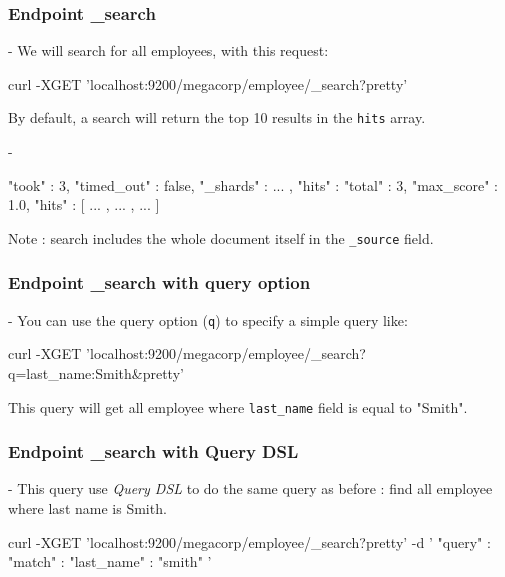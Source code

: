 \documentclass[]{beamer}
\begin{document}
\subsubsection{Endpoint \_search}

\begin{frame}[containsverbatim]{\subsecname{} - \subsubsecname{}}
  We will search for all employees, with this request:
  \begin{command}
curl -XGET 'localhost:9200/megacorp/employee/_search?pretty'
  \end{command}

  By default, a search will return the top 10 results in the \texttt{hits} array.
\end{frame}

\begin{frame}[containsverbatim]{\subsecname{} - \subsubsecname{}}
  \begin{command}
{
  "took" : 3,
  "timed_out" : false,
  "_shards" : { ... },
  "hits" : {
    "total" : 3,
    "max_score" : 1.0,
    "hits" : [ { ... }, { ... }, { ... } ]
  }
}
  \end{command}

  Note : search includes the whole document itself in the \texttt{\_source} field.
\end{frame}

\subsubsection{Endpoint \_search with query option}

\begin{frame}[containsverbatim]{\subsecname{} - \subsubsecname{}}
  You can use the query option (\texttt{q}) to specify a simple query like:

  \begin{command}
curl -XGET 'localhost:9200/megacorp/employee/_search?q=last_name:Smith&pretty'
  \end{command}

  This query will get all employee where \texttt{last\_name} field is equal to "Smith".
\end{frame}

\subsubsection{Endpoint \_search with Query DSL}

\begin{frame}[containsverbatim]{\subsecname{} - \subsubsecname{}}
  This query use \textit{Query DSL} to do the same query as before : find all employee where last name is Smith.

  \begin{command}
curl -XGET 'localhost:9200/megacorp/employee/_search?pretty' -d '
{
  "query" : {
    "match" : {
      "last_name" : "smith"
    }
  }
}'
  \end{command}
\end{frame}
\end{document}

